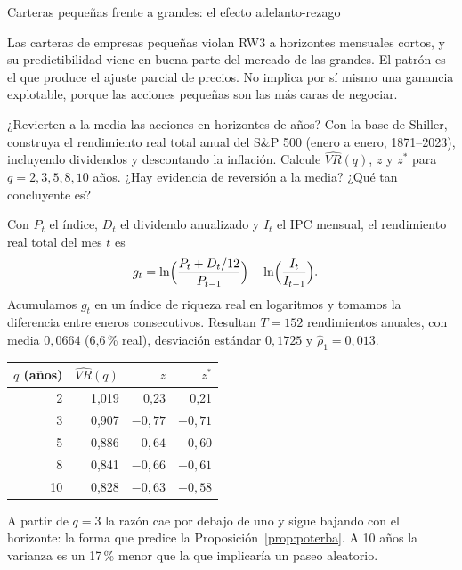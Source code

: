 \begin{ejresuelto}{Carteras pequeñas frente a grandes: el efecto adelanto-rezago}
\begin{conclusion}
Las carteras de empresas pequeñas violan RW3 a horizontes mensuales cortos, y su predictibilidad viene en
buena parte del mercado de las grandes. El patrón es el que produce el ajuste parcial de precios. No implica
por sí mismo una ganancia explotable, porque las acciones pequeñas son las más caras de negociar.
\end{conclusion}
\end{ejresuelto}

\begin{ejresuelto}{¿Revierten a la media las acciones en horizontes de años?}\label{ej:reversion}
\enunciado Con la base de Shiller, construya el rendimiento real total anual del S\&P 500 (enero a enero,
1871--2023), incluyendo dividendos y descontando la inflación. Calcule $\widehat{VR}(q)$, $z$ y $z^*$ para
$q=2,3,5,8,10$ años. ¿Hay evidencia de reversión a la media? ¿Qué tan concluyente es?

\solucion
{} Con $P_t$ el índice, $D_t$ el dividendo anualizado y $I_t$ el
IPC mensual, el rendimiento real total del mes $t$ es
\begin{align*}
  g_t &= \ln\Bigl(\frac{P_t+D_t/12}{P_{t-1}}\Bigr)-\ln\Bigl(\frac{I_t}{I_{t-1}}\Bigr).
\end{align*}
Acumulamos $g_t$ en un índice de riqueza real en logaritmos y tomamos la diferencia entre eneros consecutivos.
Resultan $T=152$ rendimientos anuales, con media $0{,}0664$ (6,6\,\% real), desviación estándar $0{,}1725$ y
$\hat\rho_1=0{,}013$.

\begin{center}\small
\begin{tabular}{@{}rrrr@{}}
\toprule
$q$ (años) & $\widehat{VR}(q)$ & $z$ & $z^*$ \\
\midrule
2  & 1,019 & 0,23 & 0,21 \\
3  & 0,907 & $-0{,}77$ & $-0{,}71$ \\
5  & 0,886 & $-0{,}64$ & $-0{,}60$ \\
8  & 0,841 & $-0{,}66$ & $-0{,}61$ \\
10 & 0,828 & $-0{,}63$ & $-0{,}58$ \\
\bottomrule
\end{tabular}
\end{center}
A partir de $q=3$ la razón cae por debajo de uno y sigue bajando con el horizonte: la forma que predice la
Proposición~\ref{prop:poterba}. A 10 años la varianza es un 17\,\% menor que la que implicaría un paseo
aleatorio.


\end{ejresuelto}
